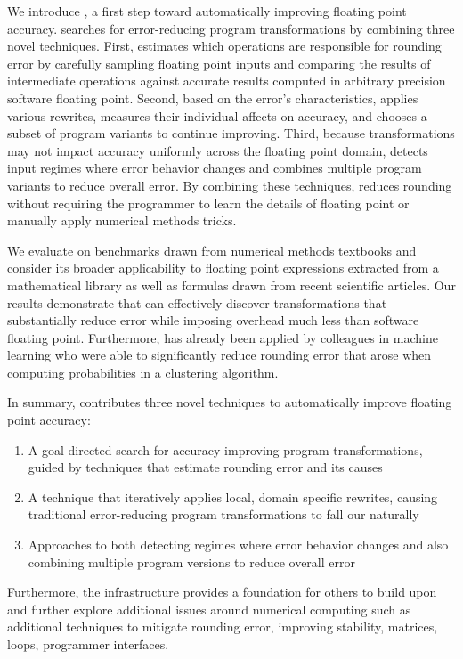 \documentclass[paper.tex]{subfiles}
\begin{document}
We introduce \casio, a first step toward automatically improving
floating point accuracy.  \casio searches for error-reducing program
transformations by combining three novel techniques.  First, \casio
estimates which operations are responsible for rounding error by
carefully sampling floating point inputs and comparing the results of
intermediate operations against accurate results computed in arbitrary
precision software floating point.  Second, based on the error's
characteristics, \casio applies various rewrites, measures their
individual affects on accuracy, and chooses a subset of program
variants to continue improving.  Third, because transformations may
not impact accuracy uniformly across the floating point domain, \casio
detects input regimes where error behavior changes and combines
multiple program variants to reduce overall error.  By combining these
techniques, \casio reduces rounding without requiring the programmer
to learn the details of floating point or manually apply numerical
methods tricks.

We evaluate \casio on benchmarks drawn from numerical methods
textbooks and consider its broader applicability to floating point
expressions extracted from a mathematical library as well as formulas
drawn from recent scientific articles.  Our results demonstrate that
\casio can effectively discover transformations that substantially
reduce error while imposing overhead much less than software floating
point.  Furthermore, \casio has already been applied by colleagues in
machine learning who were able to significantly reduce rounding error
that arose when computing probabilities in a clustering algorithm.

In summary, \casio contributes three novel techniques to automatically
improve floating point accuracy:
\begin{enumerate}
\item A goal directed search for accuracy improving program
  transformations, guided by techniques that estimate rounding error
  and its causes
\item A technique that iteratively applies local, domain specific
  rewrites, causing traditional error-reducing program transformations
  to fall our naturally
\item Approaches to both detecting regimes where error behavior
  changes and also combining multiple program versions to reduce
  overall error
\end{enumerate}
Furthermore, the \casio infrastructure provides a foundation for
others to build upon and further explore additional issues around
numerical computing such as additional techniques to mitigate rounding
error, improving stability, matrices, loops, programmer interfaces.
\end{document}
